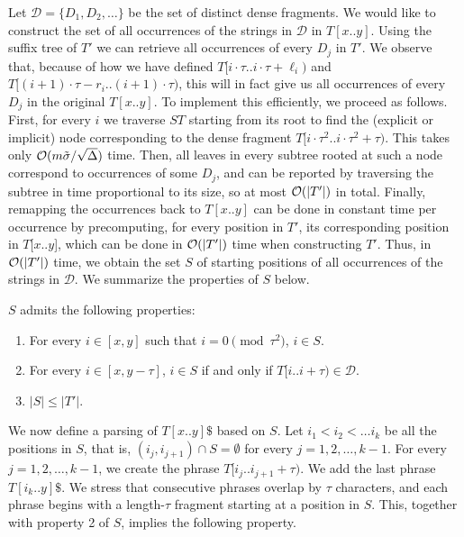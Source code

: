 Let $\mathcal{D}=\{D_{1},D_{2},\ldots\}$ be the set of distinct dense fragments.
We would like to construct the set of all occurrences of the strings in $\mathcal{D}$ in $T[x..y]$.
Using the suffix tree of $T'$ we can retrieve all occurrences
of every $D_{j}$ in $T'$. We observe that, because of how we have defined $T[i\cdot \tau.. i\cdot \tau+\ell_{i})$ and
$T[(i+1)\cdot \tau-r_{i} .. (i+1)\cdot \tau)$, this will in fact give us all occurrences of every $D_{j}$ in the original $T[x..y]$.
To implement this efficiently, we proceed as follows. First, for every $i$ we traverse $ST$ starting from its root to find the (explicit or implicit)
node corresponding to the dense fragment $T[i\cdot \tau^{2}.. i\cdot \tau^{2} + \tau)$.
This takes only $\mathcal{O}(m\tilde{\sigma}/\sqrt{\Delta})$ time.
Then, all leaves in every subtree rooted at such a node correspond to occurrences of some $D_{j}$, and can be
reported by traversing the subtree in time proportional to its size, so at most $\mathcal{O}(|T'|)$ in total.
Finally, remapping the occurrences back to $T[x..y]$ can be done in constant time per occurrence by precomputing,
for every position in $T'$, its corresponding position in $T[x..y$], which can be done in $\mathcal{O}(|T'|)$ time when
constructing $T'$. Thus, in $\mathcal{O}(|T'|)$ time, we obtain the set $S$ of starting positions of all occurrences
of the strings in $\mathcal{D}$. We summarize the properties of $S$ below.

\begin{proposition}
$S$ admits the following properties:
\begin{enumerate}
\item For every $i\in [x,y]$ such that $i = 0 \pmod {\tau^{2}}$, $i\in S$.
\item For every $i\in [x,y-\tau]$, $i\in S$ if and only if $T[i..i+\tau) \in \mathcal{D}$.
\item $|S| \leq |T'|$.
\end{enumerate}
\end{proposition}

We now define a parsing of $T[x..y]\$ $ based on $S$.
Let $i_{1}<i_{2}<\ldots i_{k}$ be all the positions in $S$, that is, $(i_{j},i_{j+1}) \cap S = \emptyset $ for every $j=1,2,\ldots,k-1$.
For every $j=1,2,\ldots,k-1$, we create the phrase $T[i_{j}.. i_{j+1}+\tau)$. We add the last phrase $T[i_{k}.. y]\$$. We stress that
consecutive phrases overlap by $\tau$ characters, and each phrase begins with a length-$\tau$ fragment starting at a position in $S$.
This, together with property 2 of $S$, implies the following property.

